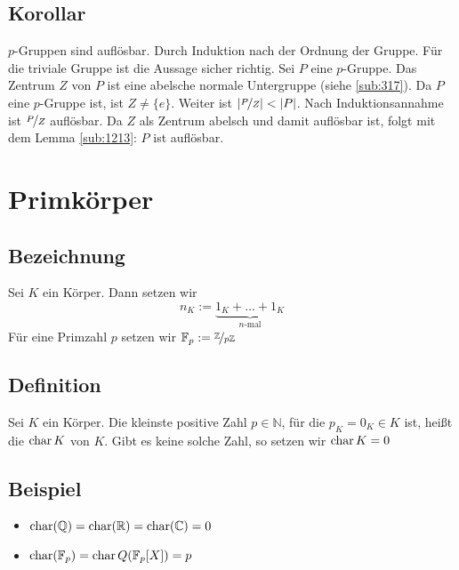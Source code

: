 \subsection[Korollar: $p$-Gruppen sind auflösbar]{Korollar} %
\label{sub:1214}
$p$-Gruppen sind auflösbar.
Durch Induktion nach der Ordnung der Gruppe. Für die triviale Gruppe ist die Aussage sicher richtig. Sei $P$ eine $p$-Gruppe. Das Zentrum $Z$ von $P$ ist eine abelsche 
normale Untergruppe (siehe \ref{sub:317}). Da $P$ eine $p$-Gruppe ist, ist $Z\not= \{e\}$. Weiter ist $\abs{\nicefrac{P}{Z}} < \abs{P}  $. Nach Induktionsannahme ist
$\nicefrac{P}{Z}$ auflösbar. Da $Z$ als Zentrum abelsch und damit auflösbar ist, folgt mit dem Lemma \ref{sub:1213}: $P$ ist auflösbar. \bewende
\newpage
\section{Primkörper} %
\label{sec:13}
\subsection[Bezeichnung: Natürliche Zahl in einem beliebigen Körper]{Bezeichnung} %
\label{sub:131}
Sei $K$ ein Körper. Dann setzen wir
\[
	n_K := \underbrace{1_K + \ldots + 1_K}_{n \text{-mal}} \tag{oft auch kurz $n=n_K$}
\]
Für eine Primzahl $p$ setzen wir $\mathds{F}_p := \nicefrac{\mathds{Z}}{p \mathds{Z}}$

\subsection[Definition: Charakteristik eines Körpers]{Definition} %
\label{sub:132}
Sei $K$ ein Körper. Die kleinste positive Zahl $p \in \mathds{N}$, für die $p_K=0_K \in K$ ist, heißt die  $\Char K$ von $K$. Gibt es keine solche Zahl, so setzen wir $\Char K =0$ 

\subsection[Beispiele für Charakteristiken]{Beispiel} %
\label{sub:133}
\begin{itemize}
	\item $\Char (\mathds{Q}) = \Char(\mathds{R})= \Char(\mathds{C}) =0$
	\item $\Char (\mathds{F}_p) = \Char Q(\mathds{F}_p[X])= p$
\end{itemize}

